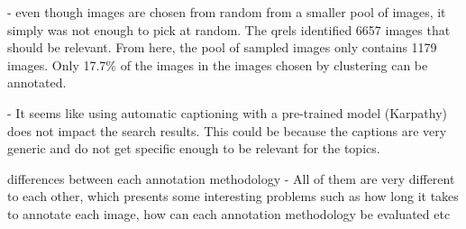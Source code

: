 


- even though images are chosen from random from a smaller pool of images, it simply was not enough to pick at random. The qrels identified 6657 images that should be relevant. From here, the pool of sampled images only contains 1179 images. Only 17.7\% of the images in the images chosen by clustering can be annotated.

- It seems like using automatic captioning with a pre-trained model (Karpathy) does not impact the search results. This could be because the captions are very generic and do not get specific enough to be relevant for the topics. 

differences between each annotation methodology - All of them are very different to each other, which presents some interesting problems such as how long it takes to annotate each image, how can each annotation methodology be evaluated etc

